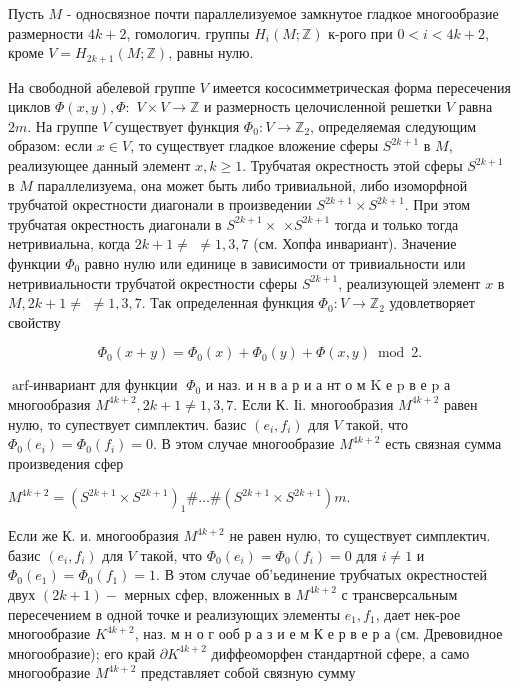 \documentclass[10pt]{article}
\begin{document}
Пусть $M$ - односвязное почти параллелизуемое замкнутое гладкое многообразие размерности $4 k+2$, гомологич. группы $H_{i}(M ; \mathbb{Z})$ к-рого при $0<i<4 k+2$, кроме $V=H_{2 k+1}(M ; \mathbb{Z})$, равны нулю.



На свободной абелевой группе $V$ имеется кососимметрическая форма пересечения циклов $\Phi(x, y), \Phi:$ $V \times V \rightarrow \mathbb{Z}$ и размерность целочисленной решетки $V$ равна $2 m$. На группе $V$ существует функция $\Phi_{0}: V \rightarrow \mathbb{Z}_{2}$, определяемая следующим образом: если $x \in V$, то существует гладкое вложение сферы $S^{2 k+1}$ в $M$, реализующее данный элемент $x, k \geqslant 1$. Трубчатая окрестность этой сферы $S^{2 k+1}$ в $M$ параллелизуема, она может быть либо тривиальной, либо изоморфной трубчатой окрестности диагонали в произведении $S^{2 k+1} \times S^{2 k+1}$. При этом трубчатая окрестность диагонали в $S^{2 k+1} \times$ $\times S^{2 k+1}$ тогда и только тогда нетривиальна, когда $2 k+1 \neq$ $\neq 1,3,7$ (см. Хопфа инвариант). Значение функции $\Phi_{0}$ равно нулю или единице в зависимости от тривиальности или нетривиальности трубчатой окрестности сферы $S^{2 k+1}$, реализующей элемент $x$ в $M, 2 k+1 \neq$ $\neq 1,3,7$. Так определенная функция $\Phi_{0}: V \rightarrow \mathbb{Z}_{2}$ удовлетворяет свойству



\[

\Phi_{0}(x+y)=\Phi_{0}(x)+\Phi_{0}(y)+\Phi(x, y) \bmod 2 .

\]



$\operatorname{arf-инвариант~для~функции~} \Phi_{0}$ и наз. и н в а р и а нт о м $\mathrm{K}$ е $\mathrm{p}$ в е $\mathrm{p}$ а многообразия $M^{4 k+2}, 2 k+1 \neq 1,3,7$. Если К. Іі. многообразия $M^{4 k+2}$ равен нулю, то супествует симплектич. базис $\left(e_{i}, f_{i}\right)$ для $V$ такой, что $\Phi_{0}\left(e_{i}\right)=\Phi_{0}\left(f_{i}\right)=0$. В этом случае многообразие $M^{4 k+2}$ есть связная сумма произведения сфер



$M^{4 k+2}=\left(S^{2 k+1} \times S^{2 k+1}\right)_{1} \# \ldots \#\left(S^{2 k+1} \times S^{2 k+1}\right) m$.



Если же К. и. многообразия $M^{4 k+2}$ не равен нулю, то существует симплектич. базис $\left(e_{i}, f_{i}\right)$ для $V$ такой, что $\Phi_{0}\left(e_{i}\right)=\Phi_{0}\left(f_{i}\right)=0$ для $i \neq 1$ и $\Phi_{0}\left(e_{1}\right)=\Phi_{0}\left(f_{1}\right)=1$. В этом случае об'ьединение трубчатых окрестностей двух $(2 k+1)-$ мерных сфер, вложенных в $M^{4 k+2}$ с трансверсальным пересечением в одной точке и реализующих элементы $e_{1}, f_{1}$, дает нек-рое многообразие $K^{4 k+2}$, наз. м н о г ооб р а з и е м К е р в е р а (см. Древовидное многообразие); его край $\partial K^{4 k+2}$ диффеоморфен стандартной сфере, а само многообразие $M^{4 k+2}$ представляет собой связную сумму
\end{document}
